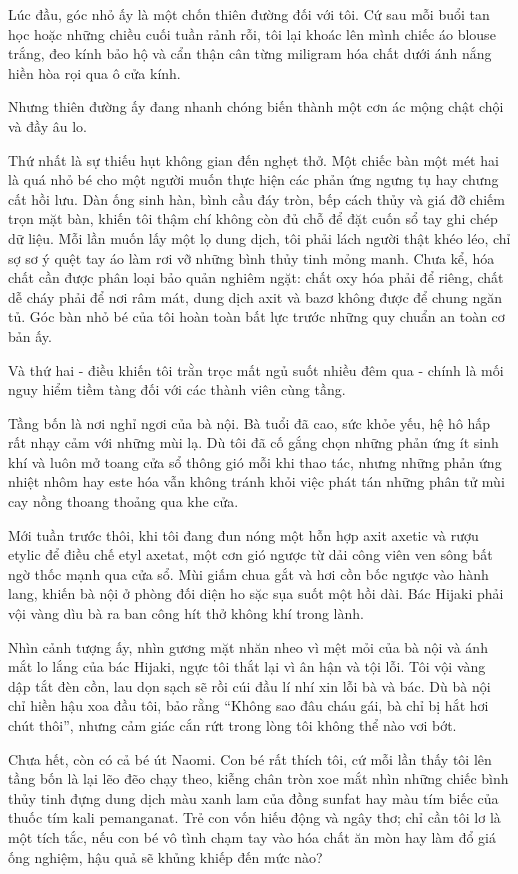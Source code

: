 \documentclass[../main.tex]{subfiles}
\begin{document}
Lúc đầu, góc nhỏ ấy là một chốn thiên đường đối với tôi. Cứ sau mỗi buổi tan học hoặc những chiều cuối tuần rảnh rỗi, tôi lại khoác lên mình chiếc áo blouse trắng, đeo kính bảo hộ và cẩn thận cân từng miligram hóa chất dưới ánh nắng hiền hòa rọi qua ô cửa kính.

Nhưng thiên đường ấy đang nhanh chóng biến thành một cơn ác mộng chật chội và đầy âu lo.

Thứ nhất là sự thiếu hụt không gian đến nghẹt thở. Một chiếc bàn một mét hai là quá nhỏ bé cho một người muốn thực hiện các phản ứng ngưng tụ hay chưng cất hồi lưu. Dàn ống sinh hàn, bình cầu đáy tròn, bếp cách thủy và giá đỡ chiếm trọn mặt bàn, khiến tôi thậm chí không còn đủ chỗ để đặt cuốn sổ tay ghi chép dữ liệu. Mỗi lần muốn lấy một lọ dung dịch, tôi phải lách người thật khéo léo, chỉ sợ sơ ý quệt tay áo làm rơi vỡ những bình thủy tinh mỏng manh. Chưa kể, hóa chất cần được phân loại bảo quản nghiêm ngặt: chất oxy hóa phải để riêng, chất dễ cháy phải để nơi râm mát, dung dịch axit và bazơ không được để chung ngăn tủ. Góc bàn nhỏ bé của tôi hoàn toàn bất lực trước những quy chuẩn an toàn cơ bản ấy.

Và thứ hai - điều khiến tôi trằn trọc mất ngủ suốt nhiều đêm qua - chính là mối nguy hiểm tiềm tàng đối với các thành viên cùng tầng.

Tầng bốn là nơi nghỉ ngơi của bà nội. Bà tuổi đã cao, sức khỏe yếu, hệ hô hấp rất nhạy cảm với những mùi lạ. Dù tôi đã cố gắng chọn những phản ứng ít sinh khí và luôn mở toang cửa sổ thông gió mỗi khi thao tác, nhưng những phản ứng nhiệt nhôm hay este hóa vẫn không tránh khỏi việc phát tán những phân tử mùi cay nồng thoang thoảng qua khe cửa.

Mới tuần trước thôi, khi tôi đang đun nóng một hỗn hợp axit axetic và rượu etylic để điều chế etyl axetat, một cơn gió ngược từ dải công viên ven sông bất ngờ thốc mạnh qua cửa sổ. Mùi giấm chua gắt và hơi cồn bốc ngược vào hành lang, khiến bà nội ở phòng đối diện ho sặc sụa suốt một hồi dài. Bác Hijaki phải vội vàng dìu bà ra ban công hít thở không khí trong lành.

Nhìn cảnh tượng ấy, nhìn gương mặt nhăn nheo vì mệt mỏi của bà nội và ánh mắt lo lắng của bác Hijaki, ngực tôi thắt lại vì ân hận và tội lỗi. Tôi vội vàng dập tắt đèn cồn, lau dọn sạch sẽ rồi cúi đầu lí nhí xin lỗi bà và bác. Dù bà nội chỉ hiền hậu xoa đầu tôi, bảo rằng ``Không sao đâu cháu gái, bà chỉ bị hắt hơi chút thôi'', nhưng cảm giác cắn rứt trong lòng tôi không thể nào vơi bớt.

Chưa hết, còn có cả bé út Naomi. Con bé rất thích tôi, cứ mỗi lần thấy tôi lên tầng bốn là lại lẽo đẽo chạy theo, kiễng chân tròn xoe mắt nhìn những chiếc bình thủy tinh đựng dung dịch màu xanh lam của đồng sunfat hay màu tím biếc của thuốc tím kali pemanganat. Trẻ con vốn hiếu động và ngây thơ; chỉ cần tôi lơ là một tích tắc, nếu con bé vô tình chạm tay vào hóa chất ăn mòn hay làm đổ giá ống nghiệm, hậu quả sẽ khủng khiếp đến mức nào?
\end{document}
